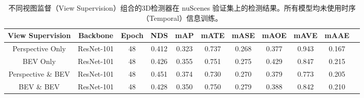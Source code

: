 \setlength{\tabcolsep}{3pt}
\setlength{\doublerulesep}{2\arrayrulewidth}
\renewcommand{\arraystretch}{1.1}
\begin{table}[t]
    \caption{不同视图监督（View Supervision）组合的3D检测器在 nuScenes 验证集上的检测结果。所有模型均未使用时序（Temporal）信息训练。}
    \label{table:view_supervision}
    \centering

    \begin{tabular}{c|c|c|cc|cccccc}
        \toprule
        View Supervision & Backbone & Epoch & NDS & mAP & mATE & mASE & mAOE & mAVE & mAAE   \\ 
        \midrule 
        Perspective Only & ResNet-101 & 48 & 0.412 & 0.323 & 0.737 & 0.268 & 0.377 & 0.943 & 0.167 \\ 
        BEV Only & ResNet-101 & 48 & 0.426 & 0.355 & 0.751 & 0.275 & 0.429 & 0.847 & 0.215 \\ 
        Perspective \& BEV & ResNet-101 & 48 & 0.451 & 0.374 & 0.730 & 0.270 & 0.379 & 0.773 & 0.205 \\ 
        BEV \& BEV & ResNet-101 & 48 & 0.428 & 0.350 & 0.750 & 0.279 & 0.388 & 0.842 & 0.210 \\ 
        \midrule
        \bottomrule
    \end{tabular}
    
\end{table}